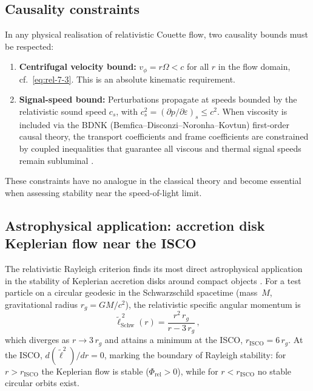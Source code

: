 \subsection{Causality constraints}
\label{sec:rel-7-66f}

In any physical realisation of relativistic Couette flow, two
causality bounds must be respected:
\begin{enumerate}
\item \textbf{Centrifugal velocity bound:}  $v_{\phi}=r\Omega<c$
  for all $r$ in the flow domain, cf.~\eqref{eq:rel-7-3}.  This is
  an absolute kinematic requirement.
\item \textbf{Signal-speed bound:}  Perturbations propagate at speeds
  bounded by the relativistic sound speed $c_{s}$, with
  $c_{s}^{2}=(\partial p/\partial\varepsilon)_{s}\le c^{2}$.  When
  viscosity is included via the BDNK (Bemfica--Disconzi--Noronha--Kovtun)
  first-order causal theory, the transport coefficients and
  frame coefficients are constrained by coupled inequalities that
  guarantee all viscous and thermal signal speeds remain subluminal
  \citep{BemficaDN2018,Kovtun2019}.
\end{enumerate}
These constraints have no analogue in the classical theory and become
essential when assessing stability near the speed-of-light limit.

\subsection{Astrophysical application: accretion disk Keplerian flow
  near the ISCO}
\label{sec:rel-7-66-astro}

The relativistic Rayleigh criterion finds its most direct astrophysical
application in the stability of Keplerian accretion disks around compact
objects \citep{NovikovThorne1973,ShakuraSunyaev1973}.  For a test particle
on a circular geodesic in the Schwarzschild spacetime (mass~$M$,
gravitational radius $r_{g}=GM/c^{2}$), the relativistic specific angular
momentum is
\begin{equation}
\label{eq:rel-7-21}
\widetilde{\ell}_{\mathrm{Schw}}^{\,2}(r)
= \frac{r^{2}\,r_{g}}{r-3\,r_{g}}\,,
\end{equation}
which diverges as $r\to 3\,r_{g}$ and attains a minimum at the ISCO,
$r_{\mathrm{ISCO}}=6\,r_{g}$.  At the ISCO,
$d(\widetilde{\ell}^{2})/dr=0$, marking the boundary of Rayleigh
stability: for $r>r_{\mathrm{ISCO}}$ the Keplerian flow is stable
($\Phi_{\mathrm{rel}}>0$), while for
$r<r_{\mathrm{ISCO}}$ no stable circular orbits exist.

